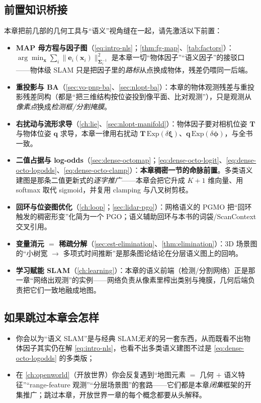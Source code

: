 \subsection*{前置知识桥接}
本章把前几部的几何工具与“语义”视角缝在一起，请先激活以下前置：
\begin{itemize}
  \item \textbf{MAP 母方程与因子图}（\cref{eq:intro-nls}；\cref{thm:fg-map}、\cref{tab:factors}）：$\arg\min_{\mathbf{x}}\sum_i\|\mathbf{e}_i(\mathbf{x}_i)\|^2_{\boldsymbol\Sigma_i^{-1}}$ 是本章一切“物体因子”“语义因子”的接驳口——物体级 SLAM 只是把因子里的\emph{路标}从点换成物体，残差仍喂同一后端。
  \item \textbf{重投影与 BA}（\cref{sec:vo-pnp-ba}、\cref{sec:nlopt-ba}）：本章的物体观测残差与重投影残差同构（都是“把三维结构按位姿投到像平面、比对观测”），只是观测从\emph{像素点}换成\emph{检测框/分割掩膜}。
  \item \textbf{右扰动与流形求导}（\cref{ch:lie}、\cref{sec:nlopt-manifold}）：物体因子要对相机位姿 $\mathbf{T}$ 与物体位姿 $\mathbf{q}$ 求导，本章一律用右扰动 $\mathbf{T}\,\mathrm{Exp}(\delta\boldsymbol\xi)$、$\mathbf{q}\,\mathrm{Exp}(\delta\boldsymbol\phi)$，与全书一致。
  \item \textbf{二值占据与 log-odds}（\cref{sec:dense-octomap}；\cref{eq:dense-octo-logit}、\cref{eq:dense-octo-logodds}、\cref{eq:dense-octo-clamp}）：\textbf{本章稠密一节的命脉前置}。多类语义建图是那条二值更新式的\emph{逐字推广}——本章会把它升成 $K{+}1$ 维向量、用 softmax 取代 sigmoid，并复用 clamping 与八叉树剪枝。
  \item \textbf{回环与位姿图优化}（\cref{ch:loop}；\cref{sec:lidar-pgo}）：网格语义的 PGMO 把“回环触发的稠密形变”化简为一个 PGO；语义辅助回环与本书的词袋/ScanContext 交叉引用。
  \item \textbf{变量消元 $=$ 稀疏分解}（\cref{sec:est-elimination}、\cref{thm:elimination}）：3D 场景图的“小树宽 $\to$ 多项式时间推断”是那条图论结论在分层语义图上的回响。
  \item \textbf{学习赋能 SLAM}（\cref{ch:learning}）：本章的语义前端（检测/分割网络）正是那一章“网络出观测”的实例——网络负责从像素里榨出类别与掩膜，几何后端负责把它们一致地融成地图。
\end{itemize}

\subsection*{如果跳过本章会怎样}
\begin{itemize}
  \item 你会以为“语义 SLAM”是与经典 SLAM\emph{无关}的另一套东西，从而既看不出物体因子其实仍在解 \cref{eq:intro-nls}，也看不出多类语义建图不过是 \cref{eq:dense-octo-logodds} 的多类版；
  \item 在 \cref{ch:openworld}（开放世界）你会反复遇到“地图元素 $=$ 几何 $+$ 语义特征”“range-feature 观测”“分层场景图”的套路——它们都是本章\emph{闭集}框架的开集推广；跳过本章，开放世界一章的每个概念都要从头解释。
\end{itemize}

